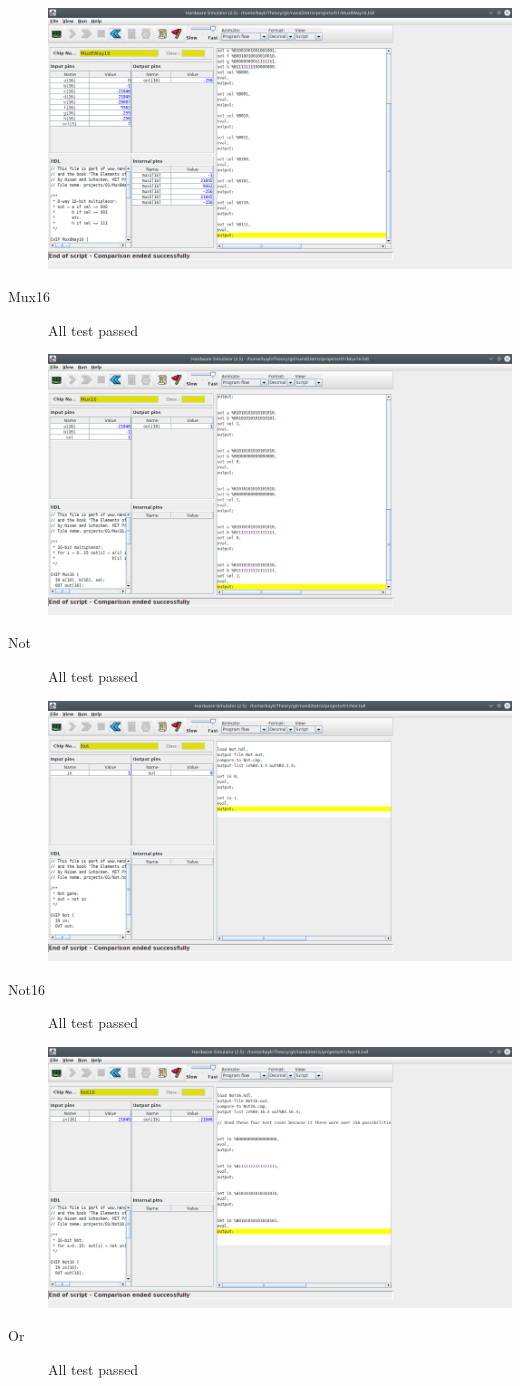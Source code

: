 \documentclass[titlepage]{article}
\begin{document}
\begin{description}
{    \includegraphics[width=.9\textwidth]{01/Mux8Way16.png}
  }
  \item[Mux16]{
    All test passed

    \includegraphics[width=.9\textwidth]{01/Mux16.png}
  }
  \item[Not]{
    All test passed

    \includegraphics[width=.9\textwidth]{01/Not.png}
  }
  \item[Not16]{
    All test passed

    \includegraphics[width=.9\textwidth]{01/Not16.png}
  }
  \item[Or]{
    All test passed

}
\end{description}
\end{document}
